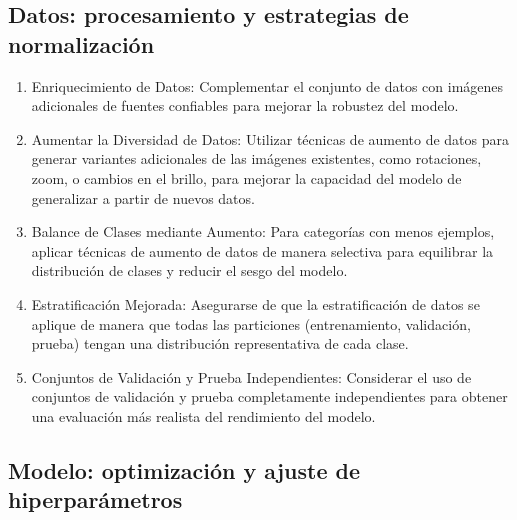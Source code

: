 \begin{recomendations}
    \subsection*{Datos: procesamiento y estrategias de normalización}

\begin{enumerate}
    \item Enriquecimiento de Datos: Complementar el conjunto de datos con imágenes adicionales de fuentes confiables para mejorar la robustez del modelo.
    \item Aumentar la Diversidad de Datos: Utilizar técnicas de aumento de datos para generar variantes adicionales de las imágenes existentes, como rotaciones, zoom, o cambios en el brillo, para mejorar la capacidad del modelo de generalizar a partir de nuevos datos.
    \item Balance de Clases mediante Aumento: Para categorías con menos ejemplos, aplicar técnicas de aumento de datos de manera selectiva para equilibrar la distribución de clases y reducir el sesgo del modelo.
    \item Estratificación Mejorada: Asegurarse de que la estratificación de datos se aplique de manera que todas las particiones (entrenamiento, validación, prueba) tengan una distribución representativa de cada clase.
    \item Conjuntos de Validación y Prueba Independientes: Considerar el uso de conjuntos de validación y prueba completamente independientes para obtener una evaluación más realista del rendimiento del modelo.
\end{enumerate}

\subsection*{Modelo: optimización y ajuste de hiperparámetros}


\end{recomendations}
